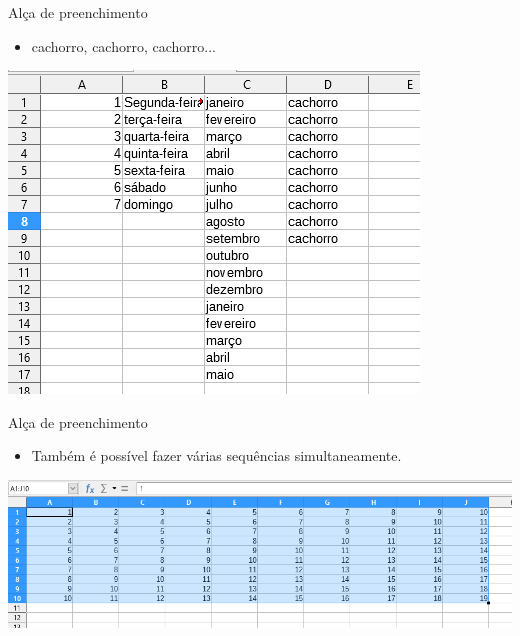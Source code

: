 \begin{frame}{Alça de preenchimento}
	\begin{block}{}
		\begin{itemize}
			\item cachorro, cachorro, cachorro...
		\end{itemize}
	\end{block}
	
	\centering
	\includegraphics[width=0.7\linewidth]{Figuras/Ch06/fig8}
\end{frame}


\begin{frame}{Alça de preenchimento}
	\begin{block}{}
		\begin{itemize}
			\item Também é possível fazer várias sequências simultaneamente.
		\end{itemize}
	\end{block}
	
	\bigskip
	
	\centering
	\includegraphics[width=1\linewidth]{Figuras/Ch06/fig9}
\end{frame}


